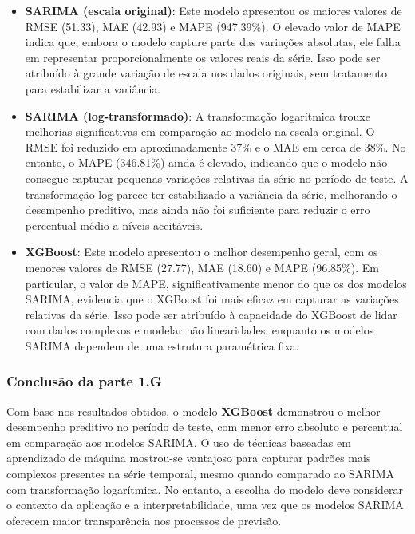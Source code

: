 \documentclass[a4paper, 12pt]{article}
\begin{document}
\begin{itemize}
    \item \textbf{SARIMA (escala original)}: Este modelo apresentou os maiores valores de RMSE (51.33), MAE (42.93) e MAPE (947.39\%). O elevado valor de MAPE indica que, embora o modelo capture parte das variações absolutas, ele falha em representar proporcionalmente os valores reais da série. Isso pode ser atribuído à grande variação de escala nos dados originais, sem tratamento para estabilizar a variância.

    \item \textbf{SARIMA (log-transformado)}: A transformação logarítmica trouxe melhorias significativas em comparação ao modelo na escala original. O RMSE foi reduzido em aproximadamente 37\% e o MAE em cerca de 38\%. No entanto, o MAPE (346.81\%) ainda é elevado, indicando que o modelo não consegue capturar pequenas variações relativas da série no período de teste. A transformação log parece ter estabilizado a variância da série, melhorando o desempenho preditivo, mas ainda não foi suficiente para reduzir o erro percentual médio a níveis aceitáveis.

    \item \textbf{XGBoost}: Este modelo apresentou o melhor desempenho geral, com os menores valores de RMSE (27.77), MAE (18.60) e MAPE (96.85\%). Em particular, o valor de MAPE, significativamente menor do que os dos modelos SARIMA, evidencia que o XGBoost foi mais eficaz em capturar as variações relativas da série. Isso pode ser atribuído à capacidade do XGBoost de lidar com dados complexos e modelar não linearidades, enquanto os modelos SARIMA dependem de uma estrutura paramétrica fixa.

\end{itemize}

\subsubsection{Conclusão da parte 1.G}
Com base nos resultados obtidos, o modelo \textbf{XGBoost} demonstrou o melhor desempenho preditivo no período de teste, com menor erro absoluto e percentual em comparação aos modelos SARIMA. O uso de técnicas baseadas em aprendizado de máquina mostrou-se vantajoso para capturar padrões mais complexos presentes na série temporal, mesmo quando comparado ao SARIMA com transformação logarítmica. No entanto, a escolha do modelo deve considerar o contexto da aplicação e a interpretabilidade, uma vez que os modelos SARIMA oferecem maior transparência nos processos de previsão.
\end{document}

